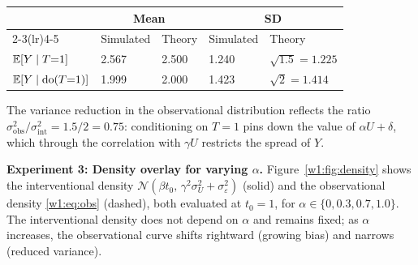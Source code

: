 \documentclass[master.tex]{subfiles}
\begin{document}
\begin{center}
\renewcommand{\arraystretch}{1.3}
\begin{tabular}{@{}lllll@{}}
\toprule
& \multicolumn{2}{c}{\textbf{Mean}} & \multicolumn{2}{c}{\textbf{SD}} \\
\cmidrule(lr){2-3}\cmidrule(lr){4-5}
& Simulated & Theory & Simulated & Theory \\
\midrule
$\mathbb{E}[Y \mid T{=}1]$         & 2.567 & 2.500
  & 1.240 & $\sqrt{1.5} = 1.225$ \\
$\mathbb{E}[Y \mid \mathrm{do}(T{=}1)]$  & 1.999 & 2.000
  & 1.423 & $\sqrt{2} = 1.414$ \\
\bottomrule
\end{tabular}
\end{center}

\noindent
The variance reduction in the observational distribution reflects the
ratio $\sigma_{\mathrm{obs}}^2/\sigma_{\mathrm{int}}^2 = 1.5/2 = 0.75$:
conditioning on $T{=}1$ pins down the value of $\alpha U + \delta$,
which through the correlation with $\gamma U$ restricts the spread of $Y$.

\medskip
\noindent\textbf{Experiment 3: Density overlay for varying $\alpha$.}
Figure~\ref{w1:fig:density} shows the interventional density
$\mathcal{N}(\beta t_0,\, \gamma^2\sigma_U^2 + \sigma_\varepsilon^2)$
(solid) and the observational density \eqref{w1:eq:obs} (dashed),
both evaluated at $t_0 = 1$, for $\alpha \in \{0, 0.3, 0.7, 1.0\}$.
The interventional density does not depend on $\alpha$ and remains fixed;
as $\alpha$ increases, the observational curve shifts rightward
(growing bias) and narrows (reduced variance).
\end{document}
